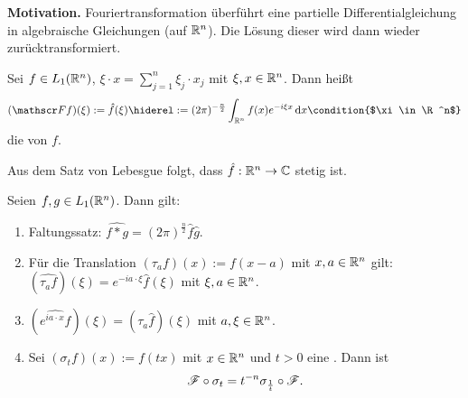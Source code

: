 
\textbf{Motivation.} Fouriertransformation überführt eine partielle Differentialgleichung in algebraische Gleichungen (auf $\mathbb{R}^n$). Die Lösung dieser wird dann wieder zurücktransformiert.

\begin{defi}
  Sei $f\in L_1(\mathbb{R}^n)$, $\xi\cdot x=\sum_{j=1}^n\xi_j\cdot x_j$ mit $\xi,x\in\mathbb{R}^n$. Dann heißt
  \begin{align*}
    (\F f)(\xi):=\hat f(\xi)
    \hiderel:= (2\pi)^{-\frac n2}\int_{\R^n}f(x)e^{-i\xi x}\d x
    \condition{$\xi\in\R^n$}
  \end{align*}
  die  von $f$.
\end{defi}

\begin{bem*}
  Aus dem Satz von Lebesgue folgt, dass $\hat f:\mathbb{R}^n\rightarrow \mathbb{C}$ stetig ist.
\end{bem*}

\begin{satz}
  \label{satz:8.1}
  Seien $f,g\in  L_1(\mathbb{R}^n)$. Dann gilt:
  \begin{enumerate}[\rm(a)]
  \item \label{satz:8.1-1} Faltungssatz: $\widehat{f\ast g}=(2\pi)^{\frac n2}\hat f\hat g$.
  \item \label{satz:8.1-2} Für die Translation $(\tau_af)(x):=f(x-a)$ mit $x,a\in\mathbb{R}^n$ gilt: $(\widehat{\tau_af})(\xi)=e^{-ia\cdot\xi}\hat f(\xi)$ mit $\xi,a\in\mathbb{R}^n$.
  \item \label{satz:8.1-3} $(\widehat{e^{ia\cdot x}f})(\xi)=(\tau_a\hat f)(\xi)$ mit $a,\xi\in\mathbb{R}^n$.
  \item \label{satz:8.1-4} Sei $(\sigma_tf)(x):=f(tx)$ mit $x\in\mathbb{R}^n$ und $t>0$ eine . Dann ist
    \[ \mathscr{F}\circ\sigma_t=t^{-n}\sigma_{\frac 1 t}\circ\mathscr{F}. \]
  \end{enumerate}
\end{satz}

